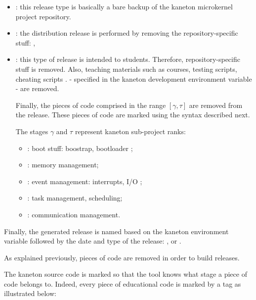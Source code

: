 \begin{itemize}
  \item
    : this release type is basically a bare backup of
    the kaneton microkernel project repository.
  \item
    : the distribution release is performed by removing
    the repository-specific stuff: ,  \etc{}
  \item
    : this type of release is intended
    to students. Therefore, repository-specific stuff is removed. Also,
    teaching materials such as courses, testing scripts, cheating scripts
    \etc{}. - specified in the kaneton development environment variable
     - are removed.

    \-

    Finally, the pieces of code comprised in the range $[\gamma,\tau]$
    are removed from the release. These pieces of code are marked using the
     syntax described next.

    \-

    The stages $\gamma$ and $\tau$ represent kaneton sub-project ranks:

    \begin{itemize}
      \item
	: boot stuff: boostrap, bootloader \etc{};
      \item
	: memory management;
      \item
	: event management: interrupts, I/O \etc{};
      \item
	: task management, scheduling;
      \item
	: communication management.
    \end{itemize}
\end{itemize}

Finally, the generated release is named based on the 
kaneton environment variable followed by the date and type of the release:
,  or .



As explained previously, pieces of code are removed in order to build
 releases.

The kaneton source code is marked so that the  tool knows
what stage a piece of code belongs to. Indeed, every piece of educational
code is marked by a tag as illustrated below:

